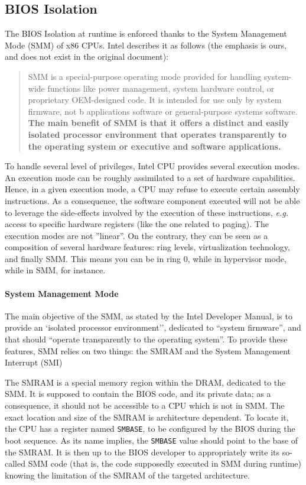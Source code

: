 \subsection{BIOS Isolation}

The BIOS Isolation at runtime is enforced thanks to the System Management Mode
(SMM) of x86 CPUs.
%
Intel describes it as follows (the emphasis is ours, and does not exist in the
original document):

\begin{quote}
  SMM is a special-purpose operating mode provided for handling system-wide
  functions like power management, system hardware control, or proprietary
  OEM-designed code.
  It is intended for use only by system firmware, not b applications software or
  general-purpose systems software.
  \textbf{The main benefit of SMM is that it offers a distinct and easily
    isolated processor environment that operates transparently to the operating
    system or executive and software applications.}
\end{quote}

To handle several level of privileges, Intel CPU provides several execution
modes.
%
An execution mode can be roughly assimilated to a set of hardware capabilities.
%
Hence, in a given execution mode, a CPU may refuse to execute certain assembly
instructions.
%
As a consequence, the software component executed will not be able to leverage
the side-effects involved by the execution of these instructions, \emph{e.g.}
access to specific hardware registers (like the one related to paging).
%
The execution modes are not ''linear''.
%
On the contrary, they can be seen as a composition of several hardware features:
ring levels, virtualization technology, and finally SMM.
%
This means you can be in ring 0, while in hypervisor mode, while in SMM, for
instance.

\paragraph{System Management Mode}
%
The main objective of the SMM, as stated by the Intel Developer Manual, is to
provide an `isolated processor environment'', dedicated to ``system firmware'',
and that should ``operate transparently to the operating system''.
%
To provide these features, SMM relies on two things: the SMRAM and the System
Management Interrupt (SMI)

The SMRAM is a special memory region within the DRAM, dedicated to the SMM.
%
It is supposed to contain the BIOS code, and its private data;
%
as a consequence, it should not be accessible to a CPU which is not in SMM.
%
The exact location and size of the SMRAM is architecture dependent.
%
To locate it, the CPU has a register named \texttt{SMBASE}, to be configured by
the BIOS during the boot sequence.
%
As its name implies, the \texttt{SMBASE} value should point to the base of the
SMRAM.
%
It is then up to the BIOS developer to appropriately write its so-called SMM
code (that is, the code supposedly executed in SMM during runtime) knowing the
limitation of the SMRAM of the targeted architecture.

